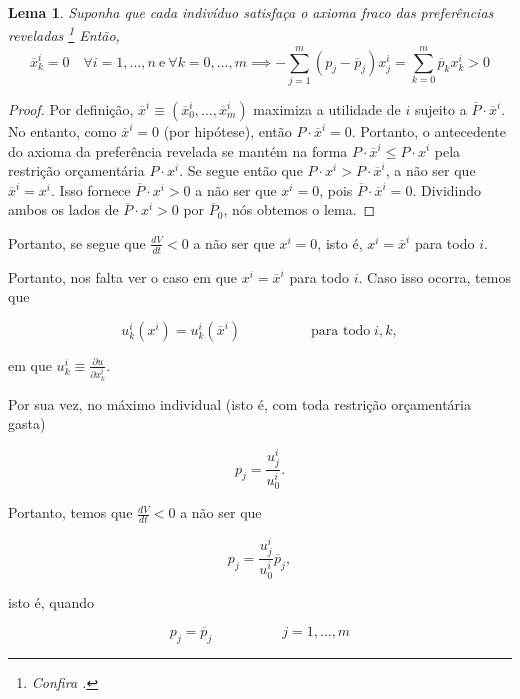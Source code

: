 \documentclass[
	12pt,				%
	openright,			%
	twoside,			%
	a4paper,			%
	english,			%
	french,				%
	spanish,			%
	brazil				%
	]{abntex2}
\newtheorem{lema}{Lema}[chapter]
\newcommand{\espaco}{\hspace{5em}}
\newcommand{\pbarra}{\overline{p}}
\newcommand{\xik}{x^i_k}
\newcommand{\xbarra}{\overline{x}}
\newcommand{\xbarraik}{\overline{x}^i_k}
\newcommand{\xij}{x^i_j}
\newcommand{\somamj}{\sum^m_{j=1}}
\newcommand{\Pbarra}{\overline{P}}
\begin{document}
\begin{lema}
	Suponha que cada indivíduo satisfaça o axioma fraco das preferências reveladas \footnote{Confira .} Então,
	\begin{equation}
		\xbarraik = 0 \quad \forall i = 1, \ldots, n \  \text{e} \ \forall k = 0, \ldots, m \implies - \somamj(p_j - \pbarra_j)\xij = \sum^m_{k=0}\pbarra_k\xik > 0
	\end{equation}
\end{lema}

\begin{proof}
	Por definição, $\xbarra^i \equiv (\xbarra^i_0, \ldots, \xbarra^i_m)$ maximiza
	a utilidade de $i$ sujeito a $\Pbarra \cdot \xbarra^i$. No entanto, como
	$\xbarra^i = 0$ (por hipótese), então $P \cdot \xbarra^i = 0$. Portanto, o
	antecedente do axioma da preferência revelada se mantém na forma
	$P \cdot \xbarra^i \leq P \cdot x^i$ pela restrição orçamentária $P \cdot x^i$.
	Se segue então que $P \cdot x^i > P \cdot \xbarra^i$, a não ser que $\xbarra^i = x^i$.
	Isso fornece $\Pbarra \cdot x^i > 0$ a não ser que $x^i = 0$, pois $\Pbarra \cdot \xbarra^i = 0$.
	Dividindo ambos os lados de $\Pbarra \cdot x^i > 0$ por $\Pbarra_0$, nós obtemos o lema.
\end{proof}

Portanto, se segue que $\frac{dV}{dt} < 0$ a não ser que $x^i = 0$, isto é,
$x^i = \xbarra^i$ para todo $i$.

Portanto, nos falta ver o caso em que $x^i = \xbarra^i$ para todo $i$. Caso isso ocorra,
temos que

\begin{equation}
	u^i_k(x^i) = u^i_k(\xbarra^i) \espaco \text{para todo} \; i, k,
\end{equation}

em que $u^i_k \equiv \frac{\partial u}{\partial \xik}$.

Por sua vez, no máximo individual (isto é, com toda restrição orçamentária gasta)

\begin{equation}
	p_j = \frac{u^i_j}{u^i_0}.
\end{equation}

Portanto, temos que $\frac{dV}{dt} < 0$ a não ser que

\begin{equation}
	p_j = \frac{u^i_j}{u^i_0} \pbarra_j,
\end{equation}

isto é, quando

\begin{equation}
	p_j = \pbarra_j \espaco j = 1, \ldots, m
\end{equation}
\end{document}
